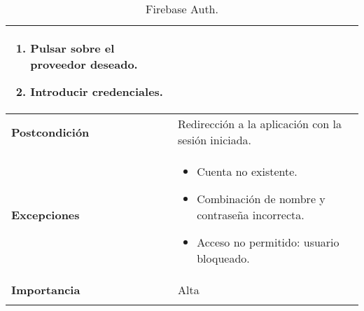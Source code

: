 \begin{longtable}[H]{@{}l|l@{}}
\begin{minipage}[t]{0.71\columnwidth}
		\begin{enumerate}
			\def\labelenumi{\arabic{enumi}.}
			\item Pulsar sobre el proveedor deseado.
			\item Introducir credenciales.
		\end{enumerate}
	\end{minipage}\tabularnewline
	\midrule
	\begin{minipage}[t]{0.23\columnwidth}\raggedright\strut
		\textbf{Postcondición}\strut
	\end{minipage} & \begin{minipage}[t]{0.71\columnwidth}\raggedright\strut
		Redirección a la aplicación con la sesión iniciada.\strut
	\end{minipage}\tabularnewline
	\midrule
	\begin{minipage}[t]{0.23\columnwidth}\raggedright\strut
		\textbf{Excepciones}\strut
	\end{minipage} & \begin{minipage}[t]{0.71\columnwidth}\raggedright
		\begin{itemize}
			\tightlist
			\item Cuenta no existente.
			\item Combinación de nombre y contraseña incorrecta.
			\item Acceso no permitido: usuario bloqueado.
		\end{itemize}
	\end{minipage}\tabularnewline
	\midrule
	\begin{minipage}[t]{0.23\columnwidth}\raggedright\strut
		\textbf{Importancia}\strut
	\end{minipage} & \begin{minipage}[t]{0.71\columnwidth}\raggedright\strut
		Alta\strut
	\end{minipage}\tabularnewline
	\bottomrule
	\caption{Firebase Auth.}
	\label{cu:1.1}
\end{longtable}
\newpage


